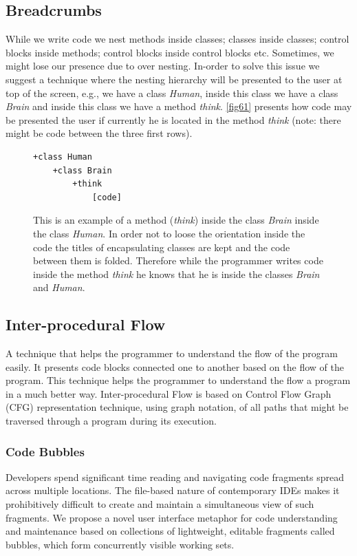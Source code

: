 \subsection{Breadcrumbs}
While we write code we nest methods inside classes; classes inside classes; control blocks inside methods; control blocks inside control blocks etc. Sometimes, we might lose our presence due to over nesting. In-order to solve this issue we suggest a technique where the nesting hierarchy will be presented to the user at top of the screen, e.g., we have a class \textit{Human}, inside this class we have a class \textit{Brain} and inside this class we have a method \textit{think}. \autoref{fig61} presents how code may be presented the user if currently he is located in the method \textit{think} (note: there might be code between the three first rows).
\begin{figure}[H]
\begin{lstlisting}
+class Human
	+class Brain
		+think
			[code]
\end{lstlisting}
\caption{This is an example of a method (\textit{think}) inside the class \textit{Brain} inside the class \textit{Human}. In order not to loose the orientation inside the code the titles of encapsulating classes are kept and the code between them is folded. Therefore while the programmer writes code inside the method \textit{think} he knows that he is inside the classes \textit{Brain} and \textit{Human}.}
\label{fig61}
\end{figure}
\subsection{Inter-procedural Flow}
A technique that helps the programmer to understand the flow of the program easily. It presents code blocks connected one to another based on the flow of the program. This technique helps the programmer to understand the flow a program in a much better way. Inter-procedural Flow is based on Control Flow Graph (CFG) representation technique, using graph notation, of all paths that might be traversed through a program during its execution.
\subsubsection{Code Bubbles}
Developers spend significant time reading and navigating code fragments spread across multiple locations. The file-based nature of contemporary IDEs makes it prohibitively difficult to create and maintain a simultaneous view of such fragments. We propose a novel user interface metaphor for code understanding and maintenance based on collections of lightweight, editable fragments called bubbles, which form concurrently visible working sets.

